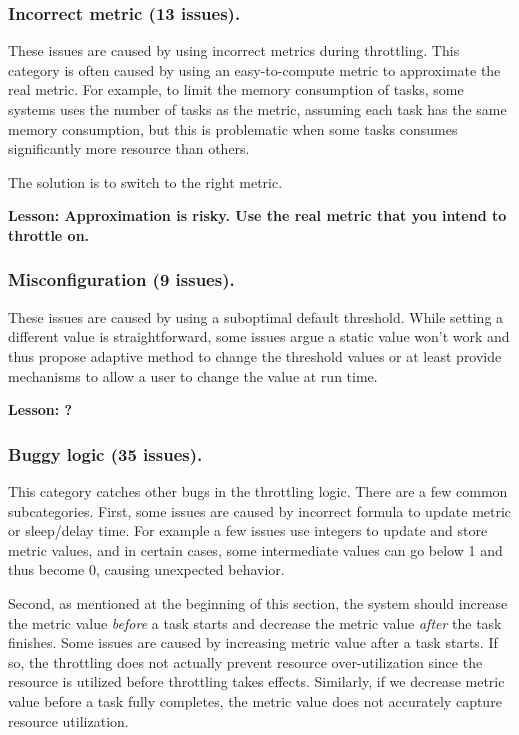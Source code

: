 \subsubsection{Incorrect metric (13 issues).} These issues are caused by using incorrect metrics during
throttling. This category is often caused by using an easy-to-compute metric to approximate
the real metric. For example, to limit the memory consumption of tasks, some systems
uses the number of tasks as the metric, assuming each task has the same memory
consumption, but this is problematic when some tasks consumes significantly more resource
than others.

The solution is to switch to the right metric.

\noindent
\textbf{Lesson: Approximation is risky. Use the real metric that you intend to throttle on.}

\subsubsection{Misconfiguration (9 issues).} These issues are caused by using a suboptimal default
threshold. While setting a different value is straightforward, some issues argue a static value
won't work and thus propose adaptive method to change the threshold values or at least
provide mechanisms to allow a user to change the value at run time.

\noindent
\textbf{Lesson: ?}

\subsubsection{Buggy logic (35 issues).} This category catches other bugs in the throttling logic.
There are a few common subcategories. First, some issues are caused by incorrect formula
to update metric or sleep/delay time. For example a few issues use integers to update and
store metric values, and in certain cases, some intermediate values can go below 1 and thus
become 0, causing unexpected behavior. 

Second, as mentioned at the beginning of this section,
the system should increase the metric value \emph{before} a task starts and decrease the metric 
value \emph{after} the task finishes. Some issues are caused by increasing metric value after
a task starts. If so, the throttling does not actually prevent resource over-utilization since the
resource is utilized before throttling takes effects. Similarly, if we decrease metric value before
a task fully completes, the metric value does not accurately capture resource utilization.

